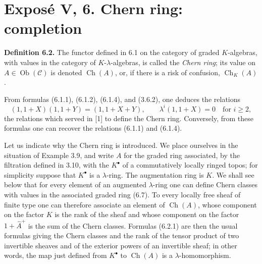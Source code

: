 \documentclass[11pt]{article}
\newcommand{\Gr}{\operatorname{Gr}}
\newcommand{\Fil}{\operatorname{Fil}}
\providecommand{\Gr}{\operatorname{Gr}}
\providecommand{\Gr}{\operatorname{G}}
\begin{document}
\providecommand{\Ghat}{\widehat G}
\providecommand{\Aqhat}{\widehat A_{\mathbb Q}}
\providecommand{\Ch}{\operatorname{Ch}}
\providecommand{\Log}{\operatorname{Log}}
\providecommand{\id}{\operatorname{id}}
\providecommand{\gr}{\operatorname{gr}}
\providecommand{\Hom}{\operatorname{Hom}}
\providecommand{\epsi}{\varepsilon}
\providecommand{\clgr}{\operatorname{cl}}
\providecommand{\Fil}{\operatorname{Fil}}
\providecommand{\Gr}{\operatorname{Gr}}
\providecommand{\Sym}{\operatorname{Sym}}


\section*{Exposé V, 6. Chern ring: completion}

\textbf{Definition 6.2.} The functor defined in 6.1 on the category of graded \(K\)-algebras, with values in the category of \(K\)-\(\lambda\)-algebras, is called the \emph{Chern ring}; its value on \(A\in\operatorname{Ob}(\mathscr C)\) is denoted \(\Ch(A)\), or, if there is a risk of confusion, \(\Ch_K(A)\).

From formulas (6.1.1), (6.1.2), (6.1.4), and (3.6.2), one deduces the relations
\begin{equation}\tag{6.2.1}
 (1,1+X)(1,1+Y)=(1,1+X+Y),
 \qquad
 \lambda^i(1,1+X)=0\quad\text{for }i\ge2,
\end{equation}
the relations which served in [1] to define the Chern ring. Conversely, from these formulas one can recover the relations (6.1.1) and (6.1.4).

Let us indicate why the Chern ring is introduced. We place ourselves in the situation of Example 3.9, and write \(A\) for the graded ring associated, by the filtration defined in 3.10, with the \(K^\bullet\) of a commutatively locally ringed topos; for simplicity suppose that \(K^\bullet\) is a \(\lambda\)-ring. The augmentation ring is \(K\). We shall see below that for every element of an augmented \(\lambda\)-ring one can define Chern classes with values in the associated graded ring (6.7). To every locally free sheaf of finite type one can therefore associate an element of \(\Ch(A)\), whose component on the factor \(K\) is the rank of the sheaf and whose component on the factor \(1+\widehat A^+\) is the sum of the Chern classes. Formulas (6.2.1) are then the usual formulas giving the Chern classes and the rank of the tensor product of two invertible sheaves and of the exterior powers of an invertible sheaf; in other words, the map just defined from \(K^\bullet\) to \(\Ch(A)\) is a \(\lambda\)-homomorphism.
\end{document}
